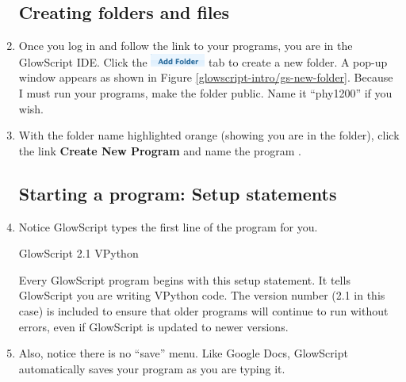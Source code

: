 \begin{enumerate}

	\subsection*{Creating folders and files}
	
	\item Once you log in and follow the link to your programs, you are in the GlowScript IDE. Click the \includegraphics[scale=0.75]{glowscript-intro/gs-add-folder} tab to create a new folder. A pop-up window appears as shown in Figure \ref{glowscript-intro/gs-new-folder}. Because I must run your programs, make the folder public. Name it ``phy1200'' if you wish.
	
	


	\item With the folder name highlighted orange (showing you are in the folder), click the link {\bf Create New Program} and name the program .
	
		
	\subsection*{Starting a program:  Setup statements}
	
	\item Notice GlowScript types the first line of the program for you.
	
\begin{myvpython}
GlowScript 2.1 VPython
\end{myvpython}
	
Every GlowScript program begins with this setup statement. It tells GlowScript you are writing VPython code. The version number (2.1 in this case) is included to ensure that older programs will continue to run without errors, even if GlowScript is updated to newer versions.

	\item Also, notice there is no ``save'' menu. Like Google Docs, GlowScript automatically saves your program as you are typing it. 
	

\end{enumerate}
